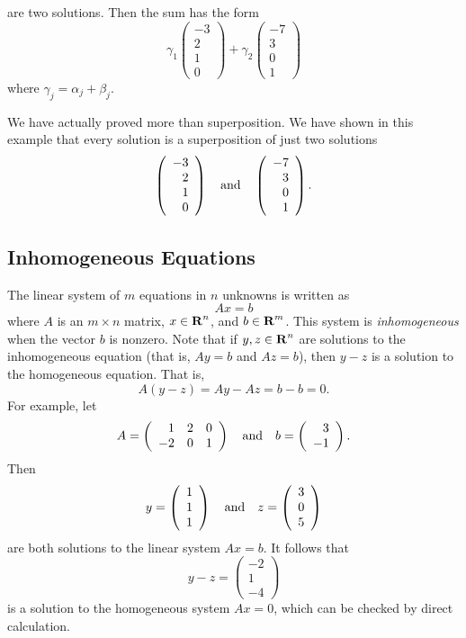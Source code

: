 are two solutions.  Then the sum has the form
\[
\gamma_1 \left(\begin{array}{r}-3\\2\\1\\0\end{array}\right) +
\gamma_2 \left(\begin{array}{r}-7\\3\\0\\1\end{array}\right)
\]
where $\gamma_j = \alpha_j + \beta_j$.


We have actually proved more than superposition.  We have shown
in this example that every solution is a superposition
of just two solutions
\[
\left(\begin{array}{r}-3\\2\\1\\0\end{array}\right) \quad\mbox{and}\quad
\left(\begin{array}{r}-7\\3\\0\\1\end{array}\right).
\]

\subsection*{Inhomogeneous Equations}

The linear system of $m$ equations in $n$ unknowns is written as
\[
Ax=b
\]
where $A$ is an $m\times n$ matrix, $x\in\mbox{$\bf{R}$}^n$, and $b\in\mbox{$\bf{R}$}^m$.
This system is {\em inhomogeneous\/} when the vector $b$ is nonzero.
Note that if $y,z\in\mbox{$\bf{R}$}^n$ are solutions to the inhomogeneous
equation (that is, $Ay=b$ and $Az=b$), then $y-z$ is a solution
to the homogeneous equation.  That is,
\[
A(y-z) = Ay - Az = b - b = 0.
\]
For example, let 
\[
A = \left(\begin{array}{rrr}  1 & 2 & 0 \\ -2 & 0 & 1 \end{array}\right)
\quad\mbox{and}\quad b = \left(\begin{array}{r} 3 \\ -1\end{array}\right).
\]
Then 
\[
y = \left(\begin{array}{c} 1\\1\\1\end{array}\right) \quad\mbox{and}\quad 
z =  \left(\begin{array}{c} 3\\0\\5\end{array}\right)
\]
are both solutions to the linear system $Ax=b$.  It follows that 
\[
y-z = \left(\begin{array}{r} -2\\1\\-4\end{array}\right)
\]
is a solution to the homogeneous system $Ax=0$, which can be checked by 
direct calculation.

